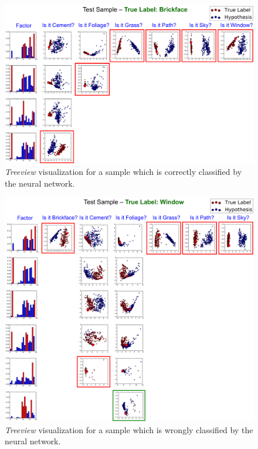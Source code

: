 \documentclass[final]{article}
\begin{document}
\begin{figure}[t]
  \centering
  \centerline{\includegraphics[width=0.85 \linewidth]{figs/positive.png}}
%
\caption{\textit{Treeview} visualization for a sample which is correctly classified by the neural network.}
\label{pos}
\end{figure}
\begin{figure}[t]
  \centering
  \centerline{\includegraphics[width=0.9 \linewidth]{figs/negative.png}}
\caption{\textit{Treeview} visualization for a sample which is wrongly classified by the neural network.}
\label{neg}
%
\end{figure}
\end{document}

